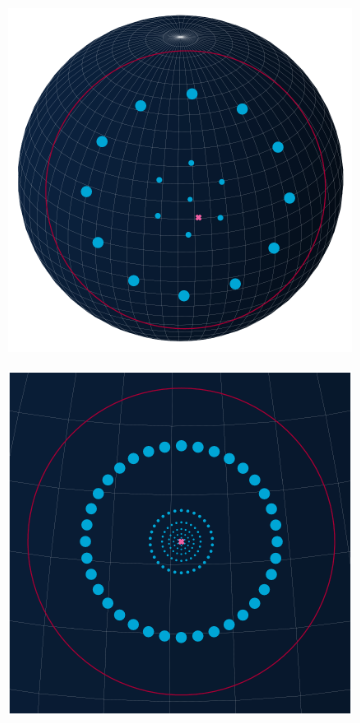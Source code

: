 \begin{figure}[t]
    \centering

   \begin{subfigure}[c]{0.49\textwidth}
      \includegraphics[width=\textwidth]{figures/plots/knocke_paneling_high.pdf}
      \end{subfigure}
   \hfill
   \begin{subfigure}[c]{0.49\textwidth}
      \includegraphics[width=\textwidth]{figures/plots/knocke_paneling_low.pdf}
   \end{subfigure}


\end{figure}
